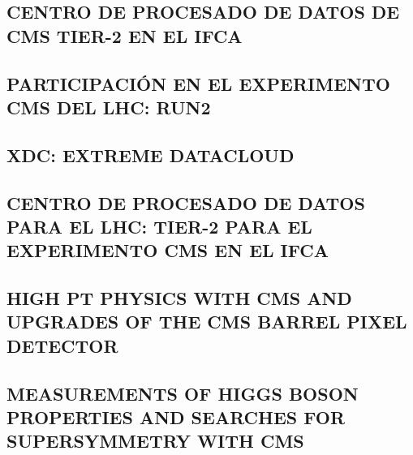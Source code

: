 \documentclass[a4paper, 11pt, twoside, openright]{report}
\begin{document}
\subsection{CENTRO DE PROCESADO DE DATOS DE CMS TIER-2 EN EL IFCA}


\subsection{PARTICIPACIÓN EN EL EXPERIMENTO CMS DEL LHC: RUN2}


\subsection{XDC: EXTREME DATACLOUD}


\subsection{CENTRO DE PROCESADO DE DATOS PARA EL LHC: TIER-2 PARA EL EXPERIMENTO CMS EN EL IFCA}


\subsection{HIGH PT PHYSICS WITH CMS AND UPGRADES OF THE CMS BARREL PIXEL DETECTOR}


\subsection{MEASUREMENTS OF HIGGS BOSON PROPERTIES AND SEARCHES FOR SUPERSYMMETRY WITH CMS}

\end{document}

